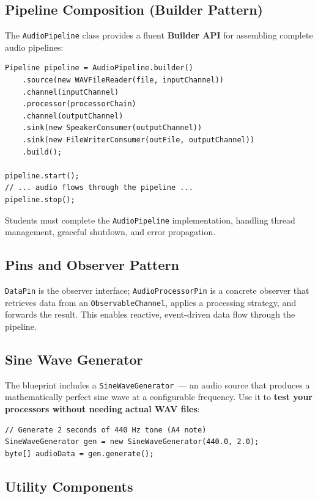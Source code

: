 \documentclass[a4paper,12pt]{article}
\begin{document}
\subsection{Pipeline Composition (Builder Pattern)}

The \texttt{AudioPipeline} class provides a fluent \textbf{Builder API}
for assembling complete audio pipelines:

\begin{lstlisting}
Pipeline pipeline = AudioPipeline.builder()
    .source(new WAVFileReader(file, inputChannel))
    .channel(inputChannel)
    .processor(processorChain)
    .channel(outputChannel)
    .sink(new SpeakerConsumer(outputChannel))
    .sink(new FileWriterConsumer(outFile, outputChannel))
    .build();

pipeline.start();
// ... audio flows through the pipeline ...
pipeline.stop();
\end{lstlisting}

Students must complete the \texttt{AudioPipeline} implementation, handling thread management,
graceful shutdown, and error propagation.

\subsection{Pins and Observer Pattern}

\texttt{DataPin} is the observer interface; \texttt{AudioProcessorPin} is a concrete observer
that retrieves data from an \texttt{ObservableChannel}, applies a processing strategy,
and forwards the result. This enables reactive, event-driven data flow through the pipeline.

\subsection{Sine Wave Generator}

The blueprint includes a \texttt{SineWaveGenerator}~--- an audio source that produces
a mathematically perfect sine wave at a configurable frequency.
Use it to \textbf{test your processors without needing actual WAV files}:

\begin{lstlisting}
// Generate 2 seconds of 440 Hz tone (A4 note)
SineWaveGenerator gen = new SineWaveGenerator(440.0, 2.0);
byte[] audioData = gen.generate();
\end{lstlisting}

\subsection{Utility Components}
\end{document}
